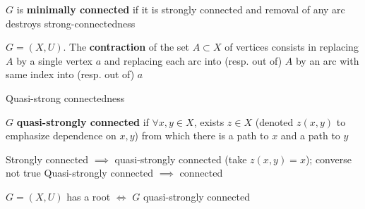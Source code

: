 \documentclass[aspectratio=43]{beamer}
\begin{document}
\begin{frame}
	\begin{definition}
	$G$ is \textbf{minimally connected} if it is strongly connected and removal of any arc destroys strong-connectedness
	\end{definition}
	\vfill
	\begin{definition}[Contraction]
	$G=(X,U)$. The \textbf{contraction} of the set $A\subset X$ of vertices consists in replacing $A$ by a single vertex $a$ and replacing each arc into (resp. out of) $A$ by an arc with same index into (resp. out of) $a$
	\end{definition}
\end{frame}
	
		
\begin{frame}{Quasi-strong connectedness}
	\begin{definition}
	$G$ \textbf{quasi-strongly connected} if $\forall x,y\in X$, exists $z\in X$ (denoted $z(x,y)$ to emphasize dependence on $x,y$) from which there is a path to $x$ and a path to $y$
	\end{definition}
	\vfill
	Strongly connected $\implies$ quasi-strongly connected (take $z(x,y)=x$); converse not true
	\vfill
	Quasi-strongly connected $\implies$ connected
	\vfill
	\begin{lemma}
	$G=(X,U)$ has a root $\iff$ $G$ quasi-strongly connected
	\end{lemma}
\end{frame}
\end{document}
